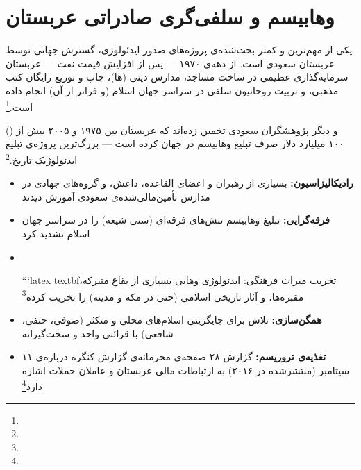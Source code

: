 \section{وهابیسم و سلفی‌گری صادراتی عربستان}
\label{sec:ch13-wahhabism}

یکی از مهم‌ترین و کمتر بحث‌شده‌ی پروژه‌های صدور ایدئولوژی، گسترش جهانی  توسط عربستان سعودی است. از دهه‌ی ۱۹۷۰ — پس از افزایش قیمت نفت — عربستان سرمایه‌گذاری عظیمی در ساخت مساجد، مدارس دینی (ها)، چاپ و توزیع رایگان کتب مذهبی، و تربیت روحانیون سلفی در سراسر جهان اسلام (و فراتر از آن) انجام داده است.\footnote{}

 () و دیگر پژوهشگران سعودی تخمین زده‌اند که عربستان بین ۱۹۷۵ و ۲۰۰۵ بیش از ۱۰۰ میلیارد دلار صرف تبلیغ وهابیسم در جهان کرده است — بزرگ‌ترین پروژه‌ی تبلیغ ایدئولوژیک تاریخ.\footnote{}

\begin{tcolorbox}[enemybox, title={پیامدهای صدور وهابیسم}]
\begin{itemize}
\item \textbf{رادیکالیزاسیون:} بسیاری از رهبران و اعضای القاعده، داعش، و گروه‌های جهادی در مدارس تأمین‌مالی‌شده‌ی سعودی آموزش دیدند
\item \textbf{فرقه‌گرایی:} تبلیغ وهابیسم تنش‌های فرقه‌ای (سنی-شیعه) را در سراسر جهان اسلام تشدید کرد
\item \

```latex
textbf{تخریب میراث فرهنگی:} ایدئولوژی وهابی بسیاری از بقاع متبرکه، مقبره‌ها، و آثار تاریخی اسلامی (حتی در مکه و مدینه) را تخریب کرده\footnote{}
\item \textbf{همگن‌سازی:} تلاش برای جایگزینی اسلام‌های محلی و متکثر (صوفی، حنفی، شافعی) با قرائتی واحد و سخت‌گیرانه
\item \textbf{تغذیه‌ی تروریسم:} گزارش ۲۸ صفحه‌ی محرمانه‌ی گزارش کنگره درباره‌ی ۱۱ سپتامبر (منتشرشده در ۲۰۱۶) به ارتباطات مالی عربستان و عاملان حملات اشاره دارد\footnote{}
\end{itemize}
\end{tcolorbox}

